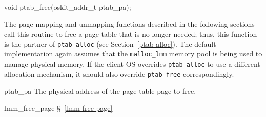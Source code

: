 \label{ptab-free}
\begin{apisyn}

	\funcproto void ptab_free(oskit_addr_t ptab_pa);
\end{apisyn}
\begin{apidesc}
	The page mapping and unmapping functions
	described in the following sections
	call this routine to free a page table that is no longer needed;
	thus, this function is the partner of {\tt ptab_alloc}
	(see Section~\ref{ptab-alloc}).
	The default implementation again assumes
	that the {\tt malloc_lmm} memory pool
	is being used to manage physical memory.
	If the client OS overrides {\tt ptab_alloc}
	to use a different allocation mechanism,
	it should also override {\tt ptab_free} correspondingly.
\end{apidesc}
\begin{apiparm}
	\item[ptab_pa]
		The physical address of the page table page to free.
\end{apiparm}
\begin{apidep}
	\item[lmm_free_page]	\S~\ref{lmm-free-page}
\end{apidep}

